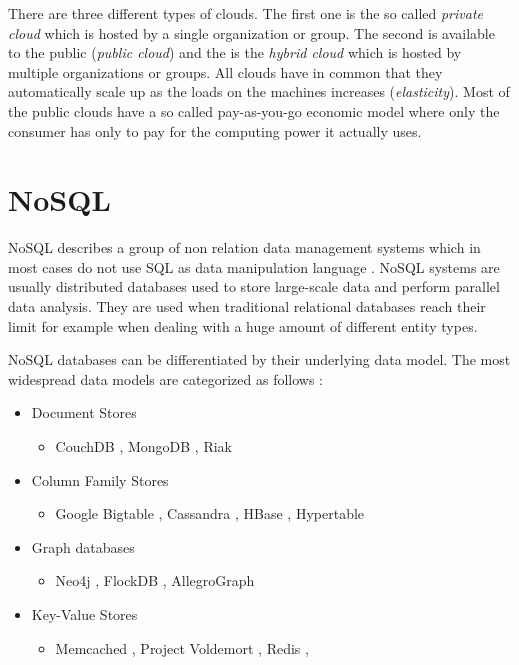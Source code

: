 There are three different types of clouds. The first one is the so called \emph{private cloud} which is hosted by a single organization or group. The second is available to the public (\emph{public cloud}) and the is the \emph{hybrid cloud} which is hosted by multiple organizations or groups. All clouds have in common that they automatically scale up as the loads on the machines increases (\emph{elasticity}). Most of the public clouds have a so called pay-as-you-go economic model where only the consumer has only to pay for the computing power it actually uses. \cite[2]{dikaiakos.2009}


\section{NoSQL}
\label{sec:nosql}
\acf{NoSQL} describes a group of non relation data management systems which in most cases do not use \acf{SQL} as data manipulation language \cite[1]{moniruzzaman.2013}. \ac{NoSQL} systems are usually distributed databases used to store large-scale data and perform parallel data analysis. They are used when traditional relational databases reach their limit for example when dealing with a huge amount of different entity types. \cite[1 - 2]{moniruzzaman.2013} \cite[23]{orend.2010}

NoSQL databases can be differentiated by their underlying data model. The most widespread data models are categorized as follows \cite[34]{ellis.2010} \cite[2 - 3]{hecht.2011}:

\begin{itemize}
  \item Document Stores
    \begin{itemize}
      \item CouchDB \cite{couch.2014}, MongoDB \cite{mongo.2014}, Riak \cite{riak.2014}
    \end{itemize}
  \item Column Family Stores
    \begin{itemize}
      \item Google Bigtable \cite{chang.2006}, Cassandra \cite{cassandra.2014}, HBase \cite{hbase.2014}, Hypertable \cite{hypertable.2014}
    \end{itemize}
  \item Graph databases
    \begin{itemize}
      \item Neo4j \cite{neo4j.2014}, FlockDB \cite{flock.2010}, AllegroGraph \cite{allegro.2014}
    \end{itemize}
  \item Key-Value Stores
    \begin{itemize}
      \item Memcached \cite{memcached.2014}, Project Voldemort \cite{voldemort.2013}, Redis \cite{redis.2014}, 
    \end{itemize}
\end{itemize}

